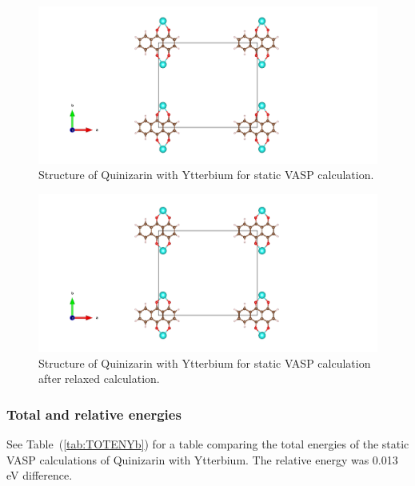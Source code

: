 \documentclass{article}
\begin{document}
      \begin{figure}[H]
        \centering
        \includegraphics[width = \textwidth]{../fig/Yb_staticbefore_CONTCAR.png}
        \caption{Structure of Quinizarin with Ytterbium for static VASP calculation. }
        \label{fig:Yb_staticbefore_CONTCAR}
      \end{figure}

      \begin{figure}[H]
        \centering
        \includegraphics[width = \textwidth]{../fig/Yb_staticafter_CONTCAR.png}
        \caption{Structure of Quinizarin with Ytterbium for static VASP calculation after relaxed calculation. }
        \label{fig:Yb_staticafter_CONTCAR}
      \end{figure}

      \vspace{1cm}

    \subsubsection{Total and relative energies}

      See Table~(\ref{tab:TOTENYb}) for a table comparing the total energies of the static VASP calculations of Quinizarin with Ytterbium. The relative energy was 0.013 eV difference. \\
\end{document}
